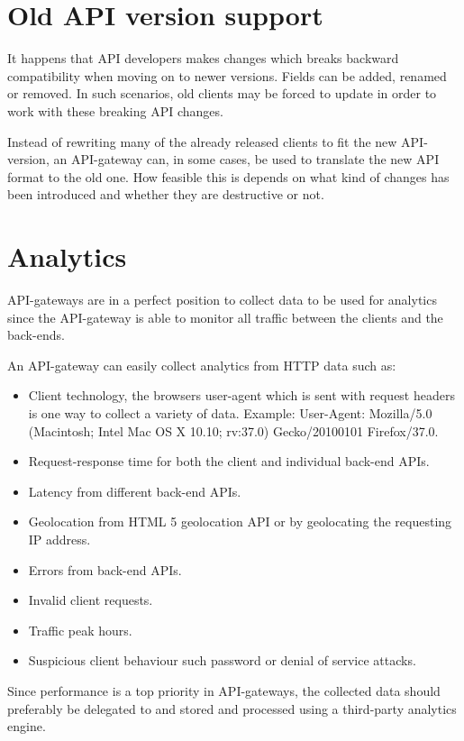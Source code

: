 \documentclass{cslthse-msc}
\begin{document}
\section{Old API version support}

It happens that API developers makes changes which breaks backward compatibility when moving on to newer versions. Fields can be added, renamed or removed. In such scenarios, old clients may be forced to update in order to work with these breaking API changes.

Instead of rewriting many of the already released clients to fit the new API-version, an API-gateway can, in some cases, be used to translate the new API format to the old one. How feasible this is depends on what kind of changes has been introduced and whether they are destructive or not.

\section{Analytics}

API-gateways are in a perfect position to collect data to be used for analytics since the API-gateway is able to monitor all traffic between the clients and the back-ends. 

An API-gateway can easily collect analytics from HTTP data such as:
\begin{itemize}
	\item Client technology, the browsers user-agent which is sent with request headers is one way to collect a variety of data. Example: User-Agent: Mozilla/5.0 (Macintosh; Intel Mac OS X 10.10; rv:37.0) Gecko/20100101 Firefox/37.0.
	\item Request-response time for both the client and individual back-end APIs.
	\item Latency from different back-end APIs.
	\item Geolocation from HTML 5 geolocation API\cite{html5_geolocation} or by geolocating the requesting IP address.
	\item Errors from back-end APIs.
	\item Invalid client requests.
	\item Traffic peak hours.
	\item Suspicious client behaviour such password or denial of service attacks.
\end{itemize}

Since performance is a top priority in API-gateways, the collected data should preferably be delegated to and stored and processed using a third-party analytics engine.
\end{document}
